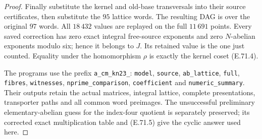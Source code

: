 \begin{proof}
Finally substitute the kernel and old-base
transversals into their source certificates, then
substitute the $95$ lattice words. The resulting DAG
is over the original $97$ words. All $18\,432$ values
are replayed on the full $11\,691$ points. Every
saved correction has zero exact integral free-source
exponents and zero $N$-abelian exponents modulo six;
hence it belongs to $J$. Its retained value is the
one just counted. Equality under the homomorphism
$\rho$ is exactly the kernel coset (E.71.4).

The programs use the prefix \texttt{a\_cm\_kn23\_}:
\texttt{model}, \texttt{source}, \texttt{ab\_lattice},
\texttt{full}, \texttt{fibres}, \texttt{witnesses},
\texttt{nprime\_comparison}, \texttt{coefficient}
and \texttt{numeric\_summary}. Their outputs retain
the actual matrices, integral lattice, complete
presentations, transporter paths and all common
word preimages. The unsuccessful preliminary
elementary-abelian guess for the index-four quotient
is separately preserved; its corrected exact
multiplication table and (E.71.5) give the cyclic
answer used here.
\end{proof}
